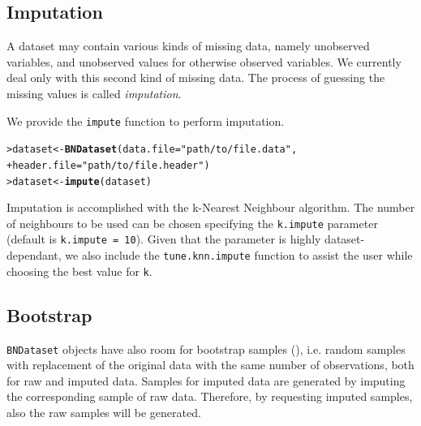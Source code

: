 \documentclass{article}\usepackage[]{graphicx}\usepackage[]{color}
\makeatletter
\newcommand{\hlstr}[1]{\textcolor[rgb]{0.192,0.494,0.8}{#1}}%
\newcommand{\hlstd}[1]{\textcolor[rgb]{0.345,0.345,0.345}{#1}}%
\newcommand{\hlkwb}[1]{\textcolor[rgb]{0.69,0.353,0.396}{#1}}%
\newcommand{\hlkwc}[1]{\textcolor[rgb]{0.333,0.667,0.333}{#1}}%
\newcommand{\hlkwd}[1]{\textcolor[rgb]{0.737,0.353,0.396}{\textbf{#1}}}%
\newenvironment{kframe}{%
 \def\at@end@of@kframe{}%
 \ifinner\ifhmode%
  \def\at@end@of@kframe{\end{minipage}}%
  \begin{minipage}{\columnwidth}%
 \fi\fi%
 \def\FrameCommand##1{\hskip\@totalleftmargin \hskip-\fboxsep
 \colorbox{shadecolor}{##1}\hskip-\fboxsep
     \hskip-\linewidth \hskip-\@totalleftmargin \hskip\columnwidth}%
 \MakeFramed {\advance\hsize-\width
   \@totalleftmargin\z@ \linewidth\hsize
   \@setminipage}}%
 {\par\unskip\endMakeFramed%
 \at@end@of@kframe}
\newenvironment{knitrout}{}{} %
\newcommand{\Robject}[1]{{\texttt{#1}}}
\newcommand{\Rmethod}[1]{{\texttt{#1}}}
\newcommand{\Rfunarg}[1]{{\texttt{#1}}}
\makeatother
\begin{document}
\subsection{Imputation}\label{sec:imputation}
A dataset may contain various kinds of missing data, namely unobserved variables,
and unobserved values for otherwise observed variables. We currently deal only with this
second kind of missing data. The process of guessing the missing values is called \emph{imputation}.

We provide the \Rmethod{impute} function to perform imputation.
\begin{knitrout}
\color{fgcolor}\begin{kframe}
\begin{alltt}
\hlstd{> }\hlstd{dataset} \hlkwb{<-} \hlkwd{BNDataset}\hlstd{(}\hlkwc{data.file}   \hlstd{=} \hlstr{"path/to/file.data"}\hlstd{,}
\hlstd{+ }                     \hlkwc{header.file} \hlstd{=} \hlstr{"path/to/file.header"}\hlstd{)}
\hlstd{> }\hlstd{dataset} \hlkwb{<-} \hlkwd{impute}\hlstd{(dataset)}
\end{alltt}
\end{kframe}
\end{knitrout}

Imputation is accomplished with the k-Nearest Neighbour algorithm. The number of neighbours to be used
can be chosen specifying the \Rfunarg{k.impute} parameter (default is \Rfunarg{k.impute = 10}). Given that
the parameter is highly dataset-dependant, we also include the \Rmethod{tune.knn.impute} function to assist
the user while choosing the best value for \Rfunarg{k}.

\subsection{Bootstrap}
\Robject{BNDataset} objects have also room for bootstrap samples (\citet{efron1994introduction}), i.e. random samples with replacement of the original data
with the same number of observations, both for raw and imputed data.
Samples for imputed data are generated by imputing the corresponding sample of raw data.
Therefore, by requesting imputed samples, also the raw samples will be generated.
\end{document}
